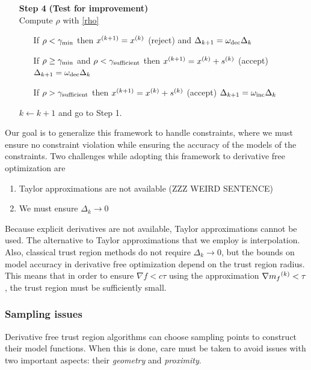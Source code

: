 \begin{algorithm}[H]
\begin{itemize}
        \item[\textbf{Step 4}] \textbf{(Test for improvement)} \\
            Compute $\rho$ with \ref{rho} \begin{itemize}
                \item[] If $\rho < \gamma_{\text{min}}$ then ${x}^{(k+1)}={x}^{(k)}$ (reject) and $\Delta_{k+1} = \omega_{\text{dec}}\Delta_{k}$
                \item[] If $\rho \ge \gamma_{\text{min}}$ and $\rho < \gamma_{\text{sufficient}}$ then ${x}^{(k+1)}={x}^{(k)}+{s}^{(k)}$ (accept) $\Delta_{k+1} = \omega_{\text{dec}}\Delta_{k}$
                \item[] If $\rho > \gamma_{\text{sufficient}}$ then ${x}^{(k+1)}={x}^{(k)}+{s}^{(k)}$ (accept) $\Delta_{k+1} = \omega_{\text{inc}}\Delta_{k}$
            \end{itemize}
            $k \gets k+1$ and go to Step 1.
    \end{itemize}
\end{algorithm}

Our goal is to generalize this framework to handle constraints, where we must ensure no constraint violation while ensuring the accuracy of the models of the constraints.
Two challenges while adopting this framework to derivative free optimization are
\begin{enumerate}
    \item Taylor approximations are not available (ZZZ WEIRD SENTENCE)
    \item We must ensure $\Delta_k \to 0$
\end{enumerate}
Because explicit derivatives are not available, Taylor approximations cannot be used.
The alternative to Taylor approximations that we employ is interpolation.
Also, classical trust region methods do not require $\Delta_k \to 0$, but the bounds on model accuracy in derivative free optimization depend on the trust region radius.
This means that in order to ensure $\nabla f < c\tau$ using the approximation  $\nabla {{m}_f}^{(k)} < \tau$, the trust region must be sufficiently small.
  
  
\subsubsection{Sampling issues}

Derivative free trust region algorithms can choose sampling points to construct their model functions.
When this is done, care must be taken to avoid issues with two important aspects: their \emph{geometry} and \emph{proximity}.

